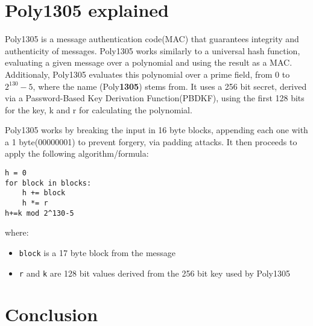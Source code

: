 \documentclass[twocolumn]{article}
\begin{document}
\section{Poly1305 explained}
Poly1305 is a message authentication code(MAC) that guarantees integrity and authenticity of messages. Poly1305 works similarly to a 
universal hash function, evaluating a given message over a polynomial and using the result as a MAC. Additionaly, Poly1305 evaluates this
polynomial over a prime field, from 0 to $2^{130}-5$, where the name (Poly\textbf{1305}) stems from. It uses a 256 bit secret, derived via a Password-Based Key Derivation
Function(PBDKF), using the first 128 bits for the key, k and r for calculating the polynomial.

Poly1305 works by breaking the input in 16 byte blocks, appending each one with a 1 byte(00000001) to prevent forgery, via padding attacks. It then proceeds to apply the 
following algorithm/formula:

\begin{verbatim}
h = 0
for block in blocks:
    h += block
    h *= r
h+=k mod 2^130-5
\end{verbatim}

where:
\begin{itemize}
    \item \texttt{block} is a 17 byte block from the message 
    \item \texttt{r} and \texttt{k} are 128 bit values derived from the 256 bit key used by Poly1305
\end{itemize}


\section{Conclusion}

\printbibliography
\end{document}
